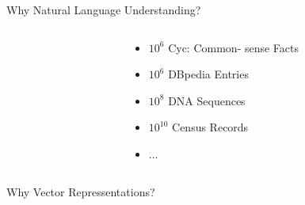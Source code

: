 \documentclass[12pt,landscape,english]{beamer}
\begin{document}
\begin{frame} {Why Natural Language Understanding?}
\begin{columns}
\begin{column}{0.5\textwidth}
\begin{itemize}
		\end{itemize}		
	\end{column}
		\begin{column}{0.5\textwidth}
			\center{}
			\begin{itemize}
				\item $10^6$ {\small Cyc: Common- sense Facts}
				\item $10^6$ DBpedia Entries
				\item $10^8$ DNA Sequences 
				\item $10^{10}$ Census Records
				\item ...
			\end{itemize}		
		\end{column}
	
\end{columns}
\end{frame}

\begin{frame} {Why Vector Repressentations?} 
	\center{}
\end{frame}
\end{document}
